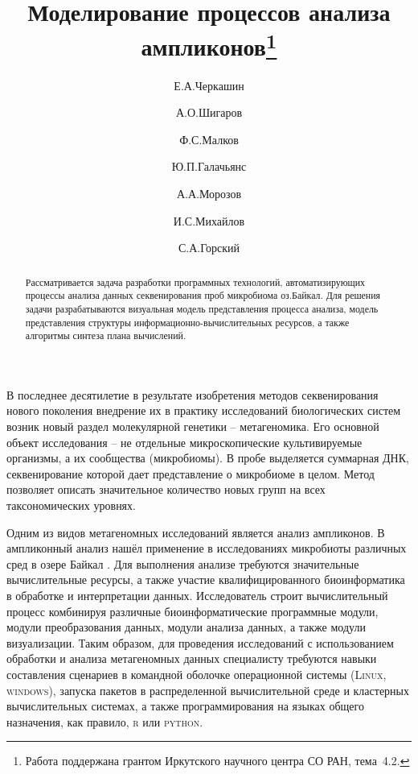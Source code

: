\documentclass[12pt]{llncs}
\begin{document}
\title{Моделирование процессов анализа ампликонов\thanks{Работа поддержана грантом Иркутского научного центра СО РАН, тема\textnumero~4.2.}}

\author{Е.А.Черкашин
  \and
  А.О.Шигаров \and
  Ф.С.Малков \and
  Ю.П.Галачьянс \and
  А.А.Морозов \and
  И.С.Михайлов \and
  С.А.Горский
}


\maketitle

\begin{abstract}
Рассматривается задача разработки программных технологий, автоматизирующих процессы анализа данных секвенирования проб микробиома оз.Байкал.  Для решения задачи разрабатываются визуальная модель представления процесса анализа, модель представления структуры информационно-вычислительных ресурсов, а также алгоритмы синтеза плана вычислений.

\end{abstract}

В последнее десятилетие в результате изобретения методов секвенирования нового поколения внедрение их в практику исследований биологических систем возник новый раздел молекулярной генетики -- метагеномика. Его основной объект исследования -- не отдельные микроскопические культивируемые организмы, а их сообщества (микробиомы).  В пробе выделяется суммарная ДНК, секвенирование которой дает представление  о микробиоме в целом.  Метод позволяет описать значительное количество новых групп на всех таксономических уровнях.

Одним из видов метагеномных исследований является анализ ампликонов. В ампликонный анализ нашёл применение в исследованиях микробиоты различных сред в озере Байкал \cite{underice}.  Для выполнения анализе требуются значительные вычислительные ресурсы, а также участие квалифицированного биоинформатика в обработке и интерпретации данных.  Исследователь строит вычислительный процесс комбинируя различные биоинформатические программные модули, модули преобразования данных, модули анализа данных, а также модули визуализации.  Таким образом, для проведения исследований с использованием обработки и анализа метагеномных данных специалисту требуются навыки составления сценариев в командной оболочке операционной системы (\textsc{Linux}, \textsc{windows}), запуска пакетов в распределенной вычислительной среде и кластерных вычислительных системах, а также программирования на языках общего назначения, как правило, \textsc{r} или \textsc{python}.
\end{document}
